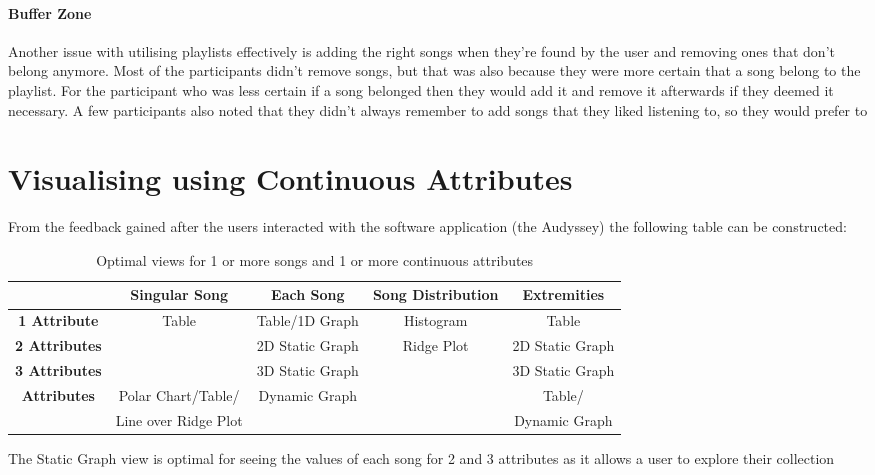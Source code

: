 \paragraph{Buffer Zone}
Another issue with utilising playlists effectively is adding the right songs when they're found by the user and removing ones that don't belong anymore. Most of the participants didn't remove songs, but that was also because they were more certain that a song belong to the playlist. For the participant who was less certain if a song belonged then they would add it and remove it afterwards if they deemed it necessary. A few participants also noted that they didn't always remember to add songs that they liked listening to, so they would prefer to 

\section{Visualising using Continuous Attributes}
From the feedback gained after the users interacted with the software application (the Audyssey) the following table can be constructed:


\begin{longtable}[c]{| c | c | c | c | c|}
    \caption{Optimal views for 1 or more songs and 1 or more continuous attributes} \\
    \toprule
    & \textbf{Singular Song}
    & \textbf{Each Song} %
    & \textbf{Song Distribution}
    & \textbf{Extremities} %
    \\
    \midrule
    \endhead

    \textbf{1 Attribute} & \multirow{3}{*}{Table} & Table/1D Graph & Histogram & Table \\*
    \cmidrule{1-1}\cmidrule{3-5}
    \textbf{2 Attributes} & & 2D Static Graph & \multirow{4}{*}{Ridge Plot} & 2D Static Graph \\*
    \cmidrule{1-1}\cmidrule{3-3}\cmidrule{5-5}
    \textbf{3 Attributes} & & 3D Static Graph & & 3D Static Graph \\*
    \cmidrule{1-3}\cmidrule{5-5}
    \multirow{2}{*}{\textbf{\>3 Attributes}} & Polar Chart/Table/ & \multirow{2}{*}{Dynamic Graph} & & Table/\\*
    & Line over Ridge Plot & & & Dynamic Graph \\*
    \midrule
\end{longtable}

The Static Graph view is optimal for seeing the values of each song for 2 and 3 attributes as it allows a user to explore their collection